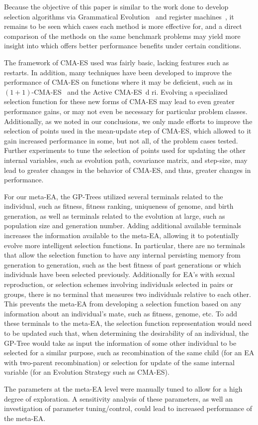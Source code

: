 \documentclass[sigconf]{acmart}
\begin{document}
Because the objective of this paper is similar to the work done to develop selection algorithms via Grammatical Evolution~\citep{lourencco2013selection} and register machines~\citep{woodward2011selection}, it remains to be seen which cases each method is more effective for, and a direct comparison of the methods on the same benchmark problems may yield more insight into which offers better performance benefits under certain conditions.

The framework of CMA-ES used was fairly basic, lacking features such as restarts. In addition, many techniques have been developed to improve the performance of CMA-ES on functions where it may be deficient, such as in $(1+1)$-CMA-ES~\citep{hong2013cmaes1plus1} and the Active CMA-ES~\citep{jastrebski2006activecmaes}d ri. Evolving a specialized selection function for these new forms of CMA-ES may lead to even greater performance gains, or may not even be necessary for particular problem classes. Additionally, as we noted in our conclusions, we only made efforts to improve the selection of points used in the mean-update step of CMA-ES, which allowed to it gain increased performance in some, but not all, of the problem cases tested. Further experiments to tune the selection of points used for updating the other internal variables, such as evolution path, covariance matrix, and step-size, may lead to greater changes in the behavior of CMA-ES, and thus, greater changes in performance.

For our meta-EA, the GP-Trees utilized several terminals related to the individual, such as fitness, fitness ranking, uniqueness of genome, and birth generation, as well as terminals related to the evolution at large, such as population size and generation number. Adding additional available terminals increases the information available to the meta-EA, allowing it to potentially evolve more intelligent selection functions. In particular, there are no terminals that allow the selection function to have any internal persisting memory from generation to generation, such as the best fitness of past generations or which individuals have been selected previously. Additionally for EA's with sexual reproduction, or selection schemes involving individuals selected in pairs or groups, there is no terminal that measures two individuals relative to each other. This prevents the meta-EA from developing a selection function based on any information about an individual's mate, such as fitness, genome, etc. To add these terminals to the meta-EA, the selection function representation would need to be updated such that, when determining the desirability of an individual, the GP-Tree would take as input the information of some other individual to be selected for a similar purpose, such as recombination of the same child (for an EA with two-parent recombination) or selection for update of the same internal variable (for an Evolution Strategy such as CMA-ES).

The parameters at the meta-EA level were manually tuned to allow for a high degree of exploration. A sensitivity analysis of these parameters, as well an investigation of parameter tuning/control, could lead to increased performance of the meta-EA.


 
\end{document}
